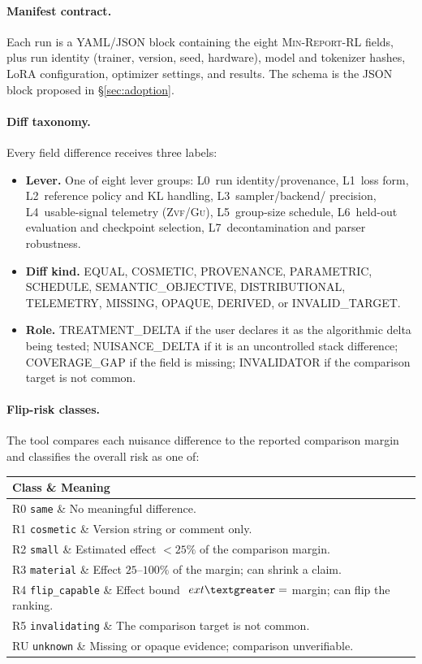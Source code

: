 \documentclass[11pt]{article}
\newcommand{\zvf}{\textsc{Zvf}}
\newcommand{\gu}{\textsc{Gu}}
\newcommand{\minreport}{\textsc{Min-Report-RL}}
\begin{document}
\paragraph{Manifest contract.} Each run is a YAML/JSON block containing the
eight \minreport{} fields, plus run identity (trainer, version, seed, hardware),
model and tokenizer hashes, LoRA configuration, optimizer settings, and results.
The schema is the JSON block proposed in \S\ref{sec:adoption}.

\paragraph{Diff taxonomy.} Every field difference receives three labels:
\begin{itemize}[leftmargin=1.4em, itemsep=2pt]
  \item \textbf{Lever.} One of eight lever groups: L0~run identity/provenance,
    L1~loss form, L2~reference policy and KL handling, L3~sampler/backend/
    precision, L4~usable-signal telemetry (\zvf/\gu{}), L5~group-size
    schedule, L6~held-out evaluation and checkpoint selection, L7~decontamination
    and parser robustness.
  \item \textbf{Diff kind.} EQUAL, COSMETIC, PROVENANCE, PARAMETRIC, SCHEDULE,
    SEMANTIC\_OBJECTIVE, DISTRIBUTIONAL, TELEMETRY, MISSING, OPAQUE, DERIVED, or
    INVALID\_TARGET.
  \item \textbf{Role.} TREATMENT\_DELTA if the user declares it as the
    algorithmic delta being tested; NUISANCE\_DELTA if it is an uncontrolled
    stack difference; COVERAGE\_GAP if the field is missing; INVALIDATOR if the
    comparison target is not common.
\end{itemize}

\paragraph{Flip-risk classes.} The tool compares each nuisance difference to
the reported comparison margin and classifies the overall risk as one of:
\begin{center}
\small
\begin{tabular}{@{}ll@{}}
\toprule
\textbf{Class} \& \textbf{Meaning}\\
\midrule
R0 \texttt{same} \& No meaningful difference.\\
R1 \texttt{cosmetic} \& Version string or comment only.\\
R2 \texttt{small} \& Estimated effect $<25\%$ of the comparison margin.\\
R3 \texttt{material} \& Effect $25$--$100\%$ of the margin; can shrink a claim.\\
R4 \texttt{flip\_capable} \& Effect bound $\	ext{\textgreater=}$ margin; can flip the ranking.\\
R5 \texttt{invalidating} \& The comparison target is not common.\\
RU \texttt{unknown} \& Missing or opaque evidence; comparison unverifiable.\\
\bottomrule
\end{tabular}
\end{center}
\end{document}
